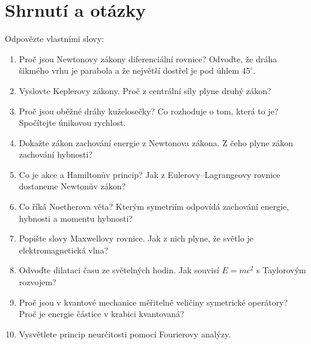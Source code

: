\section{Shrnutí a otázky}

\begin{problem}
  Odpovězte vlastními slovy:
  \begin{enumerate}
    \item Proč jsou Newtonovy zákony diferenciální rovnice? Odvoďte, že dráha šikmého vrhu je parabola a že největší dostřel je pod úhlem $45^\circ$.
    \item Vyslovte Keplerovy zákony. Proč z centrální síly plyne druhý zákon?
    \item Proč jsou oběžné dráhy kuželosečky? Co rozhoduje o tom, která to je? Spočítejte únikovou rychlost.
    \item Dokažte zákon zachování energie z Newtonova zákona. Z čeho plyne zákon zachování hybnosti?
    \item Co je akce a Hamiltonův princip? Jak z Eulerovy--Lagrangeovy rovnice dostaneme Newtonův zákon?
    \item Co říká Noetherova věta? Kterým symetriím odpovídá zachování energie, hybnosti a momentu hybnosti?
    \item Popište slovy Maxwellovy rovnice. Jak z nich plyne, že světlo je elektromagnetická vlna?
    \item Odvoďte dilataci času ze světelných hodin. Jak souvisí $E = mc^2$ s Taylorovým rozvojem?
    \item Proč jsou v kvantové mechanice měřitelné veličiny symetrické operátory? Proč je energie částice v krabici kvantovaná?
    \item Vysvětlete princip neurčitosti pomocí Fourierovy analýzy.
  \end{enumerate}
\end{problem}
